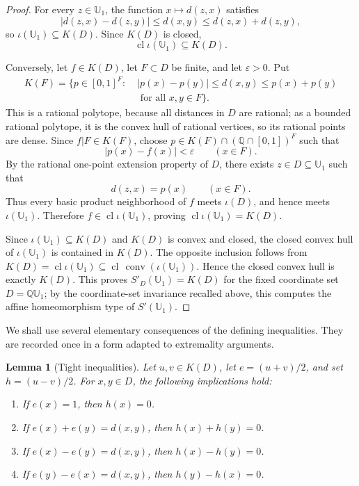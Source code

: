 \documentclass{proc-l}
\numberwithin{equation}{section}
\newtheorem{lemma}[theorem]{Lemma}
\theoremstyle{definition}
\theoremstyle{remark}
\newcommand{\U}{\mathbb U}
\newcommand{\QU}{\mathbb Q\mathbb U}
\newcommand{\conv}{\operatorname{conv}}
\newcommand{\cl}{\operatorname{cl}}
\begin{document}
\begin{proof}
For every \(z\in\U_1\), the function \(x\mapsto d(z,x)\) satisfies
\[
        |d(z,x)-d(z,y)|\le d(x,y)\le d(z,x)+d(z,y),
\]
so \(\iota(\U_1)\subseteq K(D)\).  Since \(K(D)\) is closed,
\[
        \cl\iota(\U_1)\subseteq K(D).
\]

Conversely, let \(f\in K(D)\), let \(F\subset D\) be finite, and let
\(\varepsilon>0\).  Put
\[
\begin{aligned}
        K(F)=\{p\in[0,1]^F:\;& |p(x)-p(y)|\le d(x,y)\le p(x)+p(y)\\
        &\text{ for all }x,y\in F\}.
\end{aligned}
\]
This is a rational polytope, because all distances in \(D\) are rational; as a
bounded rational polytope, it is the convex hull of rational vertices, so its
rational points are dense.  Since \(f|F\in K(F)\), choose
\(p\in K(F)\cap(\mathbb Q\cap[0,1])^F\) such that
\[
        |p(x)-f(x)|<\varepsilon\qquad(x\in F).
\]
By the rational one-point extension property of \(D\), there exists
\(z\in D\subseteq\U_1\) such that
\[
        d(z,x)=p(x)\qquad(x\in F).
\]
Thus every basic product neighborhood of \(f\) meets \(\iota(D)\), and hence
meets \(\iota(\U_1)\).  Therefore \(f\in\cl\iota(\U_1)\), proving
\(\cl\iota(\U_1)=K(D)\).

Since \(\iota(\U_1)\subseteq K(D)\) and \(K(D)\) is convex and closed, the
closed convex hull of \(\iota(\U_1)\) is contained in \(K(D)\).  The opposite
inclusion follows from \(K(D)=\cl\iota(\U_1)\subseteq\cl\,\conv(\iota(\U_1))\).
Hence the closed convex hull is exactly \(K(D)\).  This proves
\(S'_D(\U_1)=K(D)\) for the fixed coordinate set \(D=\QU_1\); by the
coordinate-set invariance recalled above, this computes the affine
homeomorphism type of \(S'(\U_1)\).
\end{proof}

We shall use several elementary consequences of the defining inequalities.
They are recorded once in a form adapted to extremality arguments.

\begin{lemma}[Tight inequalities]\label{lem:tight}
Let \(u,v\in K(D)\), let \(e=(u+v)/2\), and set \(h=(u-v)/2\).  For
\(x,y\in D\), the following implications hold:
\begin{enumerate}
\item[\textup{(i)}] If \(e(x)=1\), then \(h(x)=0\).
\item[\textup{(ii)}] If \(e(x)+e(y)=d(x,y)\), then \(h(x)+h(y)=0\).
\item[\textup{(iii)}] If \(e(x)-e(y)=d(x,y)\), then \(h(x)-h(y)=0\).
\item[\textup{(iv)}] If \(e(y)-e(x)=d(x,y)\), then \(h(y)-h(x)=0\).
\end{enumerate}
\end{lemma}
\end{document}
